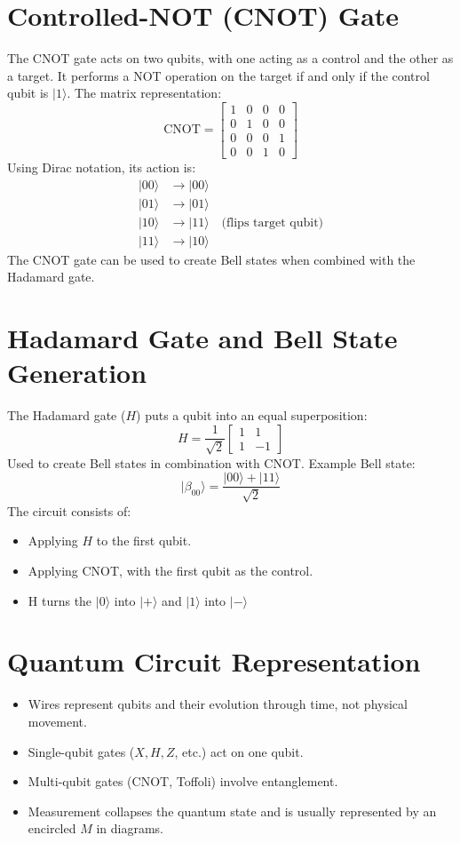 \documentclass{article}
\begin{document}
\section{Controlled-NOT (CNOT) Gate}
The CNOT gate acts on two qubits, with one acting as a control and the other as a target. It performs a NOT operation on the target if and only if the control qubit is \(|1\rangle\). The matrix representation:
\[
\text{CNOT} = \begin{bmatrix} 1 & 0 & 0 & 0 \\ 0 & 1 & 0 & 0 \\ 0 & 0 & 0 & 1 \\ 0 & 0 & 1 & 0 \end{bmatrix}
\]
Using Dirac notation, its action is:
\begin{align*}
|00\rangle &\to |00\rangle \\
|01\rangle &\to |01\rangle \\
|10\rangle &\to |11\rangle \quad \text{(flips target qubit)} \\
|11\rangle &\to |10\rangle
\end{align*}
The CNOT gate can be used to create Bell states when combined with the Hadamard gate.

\section{Hadamard Gate and Bell State Generation}
The Hadamard gate (\(H\)) puts a qubit into an equal superposition:
\[
H = \frac{1}{\sqrt{2}} \begin{bmatrix} 1 & 1 \\ 1 & -1 \end{bmatrix}
\]
Used to create Bell states in combination with CNOT. Example Bell state:
\[
|\beta_{00}\rangle = \frac{|00\rangle + |11\rangle}{\sqrt{2}}
\]
The circuit consists of:
\begin{itemize}
    \item Applying \(H\) to the first qubit.
    \item Applying CNOT, with the first qubit as the control.
    \item H turns the \(|0\rangle\) into \(|+\rangle\) and \(|1\rangle\) into \(|-\rangle\)
\end{itemize}

\section{Quantum Circuit Representation}
\begin{itemize}
    \item Wires represent qubits and their evolution through time, not physical movement.
    \item Single-qubit gates (\(X, H, Z\), etc.) act on one qubit.
    \item Multi-qubit gates (CNOT, Toffoli) involve entanglement.
    \item Measurement collapses the quantum state and is usually represented by an encircled \(M\) in diagrams.
\end{itemize}
\end{document}
